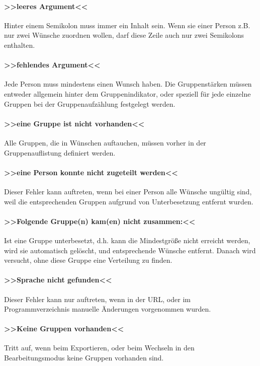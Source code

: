 \paragraph{>>leeres Argument<<} Hinter einem Semikolon muss immer ein Inhalt sein. Wenn sie einer Person z.B. nur zwei Wünsche zuordnen wollen, darf diese Zeile auch nur zwei Semikolons enthalten.

\paragraph{>>fehlendes Argument<<} Jede Person muss mindestens einen Wunsch haben. Die Gruppenstärken müssen entweder allgemein hinter dem Gruppenindikator, oder speziell für jede einzelne Gruppen bei der Gruppenaufzählung festgelegt werden.

\paragraph{>>eine Gruppe ist nicht vorhanden<<} Alle Gruppen, die in Wünschen auftauchen, müssen vorher in der Gruppenauflistung definiert werden.

\paragraph{>>eine Person konnte nicht zugeteilt werden<<} Dieser Fehler kann auftreten, wenn bei einer Person alle Wünsche ungültig sind, weil die entsprechenden Gruppen aufgrund von Unterbesetzung entfernt wurden.

\paragraph{>>Folgende Gruppe(n) kam(en) nicht zusammen:<<} Ist eine Gruppe unterbesetzt, d.h. kann die Mindestgröße nicht erreicht werden, wird sie automatisch gelöscht, und entsprechende Wünsche entfernt. Danach wird versucht, ohne diese Gruppe eine Verteilung zu finden.

\paragraph{>>Sprache nicht gefunden<<} Dieser Fehler kann nur auftreten, wenn in der URL, oder im Programmverzeichnis manuelle Änderungen vorgenommen wurden.

\paragraph{>>Keine Gruppen vorhanden<<} Tritt auf, wenn beim Exportieren, oder beim Wechseln in den Bearbeitungsmodus keine Gruppen vorhanden sind.

